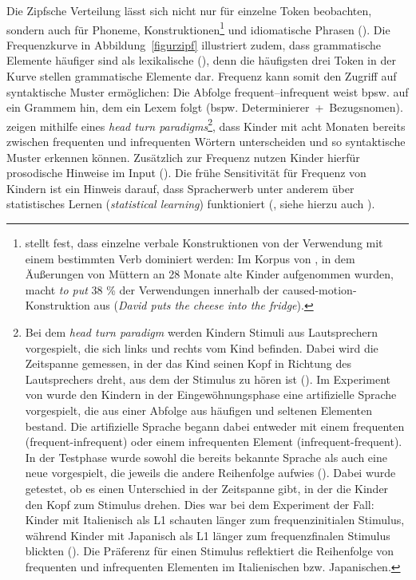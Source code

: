 Die Zipfsche Verteilung lässt sich nicht nur für einzelne Token beobachten, sondern auch für Phoneme, Konstruktionen\footnote{\label{gold}\textcite[75]{Goldberg.2006} stellt fest, dass einzelne verbale Konstruktionen von der Verwendung mit einem bestimmten Verb dominiert werden: Im Korpus von \textcite{Bates.1988}, in dem Äußerungen von Müttern an 28 Monate alte Kinder aufgenommen wurden, macht \textit{to put} 38 \% der Verwendungen innerhalb der caused-motion-Konstruktion aus (\textit{David puts the cheese into the fridge}).} und idiomatische Phrasen (\cite[235]{Ellis.2008}). Die Frequenzkurve in Abbildung~\ref{figurzipf} illustriert zudem, dass grammatische Elemente häufiger sind als lexikalische (\cite[58--59]{Gervain.2008}), denn die häufigsten drei Token in der Kurve stellen grammatische Elemente dar. Frequenz kann somit den Zugriff auf syntaktische Muster ermöglichen: Die Abfolge frequent--infrequent weist bpsw. auf ein Grammem hin, dem ein Lexem folgt (bspw. Determinierer~+~Bezugsnomen). \textcite{Gervain.2008} zeigen mithilfe eines \textit{head turn paradigms}\footnote{Bei dem \textit{head turn paradigm} werden Kindern Stimuli aus Lautsprechern vorgespielt, die sich links und rechts vom Kind befinden. Dabei wird die Zeitspanne gemessen, in der das Kind seinen Kopf in Richtung des Lautsprechers dreht, aus dem der Stimulus zu hören ist (\cite[4]{Gervain.2013}). Im Experiment von \textcite[68--69]{Gervain.2008} wurde den Kindern in der Eingewöhnungsphase eine artifizielle Sprache vorgespielt, die aus einer Abfolge aus häufigen und seltenen Elementen bestand. Die artifizielle Sprache begann dabei entweder mit einem frequenten (frequent-infrequent) oder einem infrequenten Element (infrequent-frequent). In der Testphase wurde sowohl die bereits bekannte Sprache als auch eine neue vorgespielt, die jeweils die andere Reihenfolge aufwies (\cite[69--70]{Gervain.2008}). Dabei wurde getestet, ob es einen Unterschied in der Zeitspanne gibt, in der die Kinder den Kopf zum Stimulus drehen. Dies war bei dem Experiment der Fall: Kinder mit Italienisch als L1 schauten länger zum frequenzinitialen Stimulus, während Kinder mit Japanisch als L1 länger  zum frequenzfinalen Stimulus blickten (\cite[70]{Gervain.2008}). Die Präferenz für einen Stimulus reflektiert die Reihenfolge von frequenten und infrequenten Elementen im Italienischen bzw. Japanischen.}, dass Kinder mit acht Monaten bereits zwischen frequenten und infrequenten Wörtern unterscheiden und so syntaktische Muster erkennen können. Zusätzlich zur Frequenz nutzen Kinder hierfür prosodische Hinweise im Input (\cite{Gervain.2013}). Die frühe Sensitivität für Frequenz von Kindern ist ein Hinweis darauf, dass Spracherwerb unter anderem über statistisches Lernen (\textit{statistical learning}) funktioniert (\cite[2003]{Saffran.2003}, siehe hierzu auch ). 

